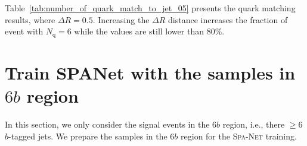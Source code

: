 \documentclass[12pt]{article}
\begin{document}
        Table~\ref{tab:number_of_quark_match_to_jet_05} presents the quark matching results, where $\Delta R = 0.5$. Increasing the $\Delta R$ distance increases the fraction of event with $N_{\text{q}} = 6$ while the values are still lower than 80\%.
        \begin{table}[htpb]
            \centering
            \caption{The quark matching table. $N_{\text{q}}$ is the number of quarks that can be matched to jets in an event.}
            \label{tab:number_of_quark_match_to_jet_05}
        \end{table}
\section{Train SPANet with the samples in \texorpdfstring{$6b$}{6b} region}%
\label{sec:train_spanet_with_the_samples_in_6b_region}
    In this section, we only consider the signal events in the $6b$ region, i.e., there $\ge 6$ $b$-tagged jets. We prepare the samples in the $6b$ region for the \textsc{Spa-Net} training.
\end{document}

